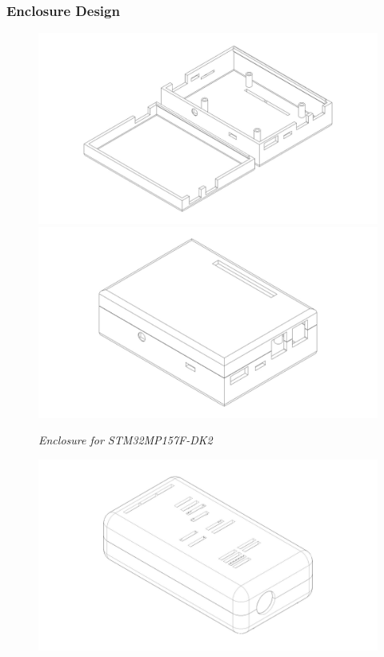 \documentclass[8pt,compress]{beamer}
\begin{document}
\begin{frame}
  \frametitle{Enclosure Design}
  \begin{minipage}{0.475\textwidth}
    \begin{figure}
      \includegraphics[width=\textwidth]{assets/electronic/stm32_enclosure_final_test_pic1.jpg}
      \includegraphics[width=\textwidth]{assets/electronic/stm32_enclosure_final_testpic2.jpg}
      \caption{\it Enclosure for STM32MP157F-DK2}
    \end{figure}
  \end{minipage}
  \hfill
  \begin{minipage}{0.45\textwidth}
    \begin{figure}
      \includegraphics[width=\textwidth]{assets/electronic/psperi_enclosure_final_testpic1.jpg}

\end{figure}
\end{minipage}
\end{frame}
\end{document}
